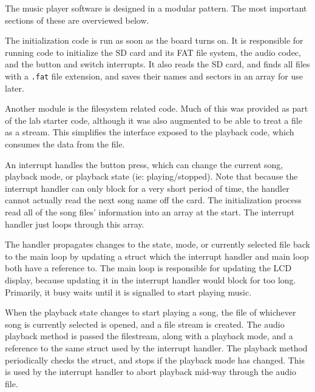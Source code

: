 \documentclass[12pt]{article}
\begin{document}
\doublespacing

The music player software is designed in a modular pattern.
The most important sections of these are overviewed below.

The initialization code is run as soon as the board turns on.
It is responsible for running code to initialize the SD card and its FAT file
system, the audio codec, and the button and switch interrupts.
It also reads the SD card, and finds all files with a \texttt{.fat} file
extension, and saves their names and sectors in an array for use later.

Another module is the filesystem related code.
Much of this was provided as part of the lab starter code, although it was also
augmented to be able to treat a file as a stream.
This simplifies the interface exposed to the playback code, which consumes the
data from the file.

An interrupt handles the button press, which can change the current song,
playback mode, or playback state (ie: playing/stopped).
Note that because the interrupt handler can only block for a very short period
of time, the handler cannot actually read the next song name off the card.
The initialization process read all of the song files' information into an
array at the start.
The interrupt handler just loops through this array.

The handler propagates changes to the state, mode, or currently selected file
back to the main loop by updating a struct which the interrupt handler and main
loop both have a reference to.
The main loop is responsible for updating the LCD display, because updating it
in the interrupt handler would block for too long.
Primarily, it busy waits until it is signalled to start playing music.

When the playback state changes to start playing a song, the file of whichever
song is currently selected is opened, and a file stream is created.
The audio playback method is passed the filestream, along with a playback mode,
and a reference to the same struct used by the interrupt handler.
The playback method periodically checks the struct, and stops if the playback
mode has changed.
This is used by the interrupt handler to abort playback mid-way through the audio
file.

\end{document}
